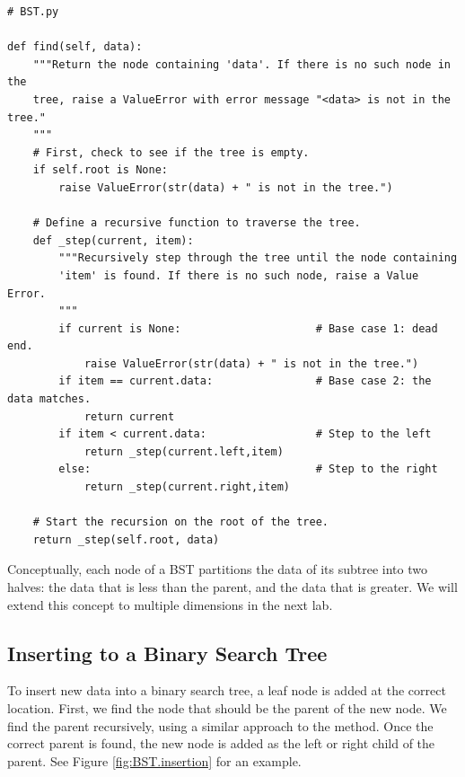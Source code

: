 \begin{lstlisting}
# BST.py

def find(self, data):
    """Return the node containing 'data'. If there is no such node in the
    tree, raise a ValueError with error message "<data> is not in the tree."
    """
    # First, check to see if the tree is empty.
    if self.root is None:
        raise ValueError(str(data) + " is not in the tree.")
    
    # Define a recursive function to traverse the tree.
    def _step(current, item):
        """Recursively step through the tree until the node containing
        'item' is found. If there is no such node, raise a Value Error.
        """
        if current is None:                     # Base case 1: dead end.
            raise ValueError(str(data) + " is not in the tree.")
        if item == current.data:                # Base case 2: the data matches.
            return current
        if item < current.data:                 # Step to the left
            return _step(current.left,item)
        else:                                   # Step to the right
            return _step(current.right,item)
    
    # Start the recursion on the root of the tree.
    return _step(self.root, data)
\end{lstlisting}

\begin{info}
Conceptually, each node of a BST partitions the data of its subtree into two halves: the data that is less than the parent, and the data that is greater.
We will extend this concept to multiple dimensions in the next lab.
\end{info}

\subsection*{Inserting to a Binary Search Tree}

To insert new data into a binary search tree, a leaf node is added at the correct location.
First, we find the node that should be the parent of the new node.
We find the parent recursively, using a similar approach to the  method.
Once the correct parent is found, the new node is added as the left or right child of the parent.
See Figure \ref{fig:BST.insertion} for an example.

